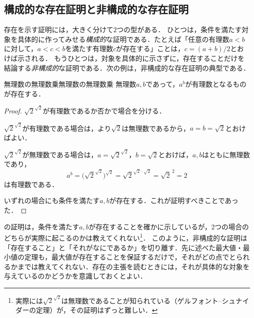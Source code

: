 \subsection{構成的な存在証明と非構成的な存在証明}

存在を示す証明には，大きく分けて$2$つの型がある．
ひとつは，条件を満たす対象を具体的に作ってみせる\emph{構成的}な証明である．たとえば「任意の有理数$a < b$に対して，$a < c < b$を満たす有理数$c$が存在する」ことは，$c = (a + b)/2$とおけば示される．
もうひとつは，対象を具体的に示さずに，存在することだけを結論する\emph{非構成的}な証明である．次の例は，非構成的な存在証明の典型である．

\begin{prop}{無理数の無理数乗}{無理数の無理数乗}
  無理数$a,b$であって，$a^b$が有理数となるものが存在する．
\end{prop}

\begin{tleftbar}
  \begin{proof}
    $\sqrt{2}^{\sqrt{2}}$が有理数であるか否かで場合を分ける．

    $\sqrt{2}^{\sqrt{2}}$が有理数である場合は，より$\sqrt{2}$は無理数であるから，$a = b = \sqrt{2}$とおけばよい．

    $\sqrt{2}^{\sqrt{2}}$が無理数である場合は，$a = \sqrt{2}^{\sqrt{2}}$，$b = \sqrt{2}$とおけば，$a,b$はともに無理数であり，
    \[
      a^b = \bigl( \sqrt{2}^{\sqrt{2}} \bigr)^{\sqrt{2}} = \sqrt{2}^{\sqrt{2} \cdot \sqrt{2}} = \sqrt{2}^{\,2} = 2
    \]
    は有理数である．

    いずれの場合にも条件を満たす$a,b$が存在する．これが証明すべきことであった．
  \end{proof}
\end{tleftbar}

\begin{remark}[非構成的な証明からわかること]
  の証明は，条件を満たす$a,b$が存在することを確かに示しているが，$2$つの場合のどちらが実際に起こるのかは教えてくれない\footnote{実際には$\sqrt{2}^{\sqrt{2}}$は無理数であることが知られている（ゲルフォント--シュナイダーの定理）が，その証明はずっと難しい．}．
  このように，非構成的な証明は「存在すること」と「それがなにであるか」を切り離す．先に述べた最大値・最小値の定理も，最大値が存在することを保証するだけで，それがどの点でとられるかまでは教えてくれない．存在の主張を読むときには，それが具体的な対象を与えているのかどうかを意識しておくとよい．
\end{remark}

